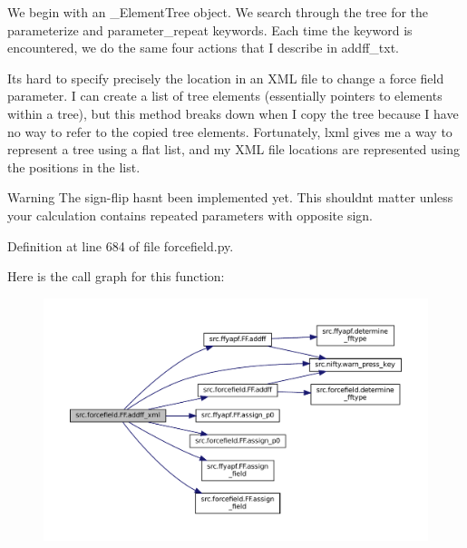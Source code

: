 We begin with an \+\_\+\+Element\+Tree object. We search through the tree for the \textquotesingle{}parameterize\textquotesingle{} and \textquotesingle{}parameter\+\_\+repeat\textquotesingle{} keywords. Each time the keyword is encountered, we do the same four actions that I describe in addff\+\_\+txt.

It\textquotesingle{}s hard to specify precisely the location in an X\+ML file to change a force field parameter. I can create a list of tree elements (essentially pointers to elements within a tree), but this method breaks down when I copy the tree because I have no way to refer to the copied tree elements. Fortunately, lxml gives me a way to represent a tree using a flat list, and my X\+ML file \textquotesingle{}locations\textquotesingle{} are represented using the positions in the list.

\begin{DoxyWarning}{Warning}
The sign-\/flip hasn\textquotesingle{}t been implemented yet. This shouldn\textquotesingle{}t matter unless your calculation contains repeated parameters with opposite sign. 
\end{DoxyWarning}


Definition at line 684 of file forcefield.\+py.

Here is the call graph for this function\+:
\nopagebreak
\begin{figure}[H]
\begin{center}
\leavevmode
\includegraphics[width=350pt]{classsrc_1_1forcefield_1_1FF_a6e68a9d214deb509c95b830e81aa18ce_cgraph}
\end{center}
\end{figure}
\mbox{\label{classsrc_1_1forcefield_1_1FF_ac8299d9ef9a75fcfc2ddfd3621924241}} 
